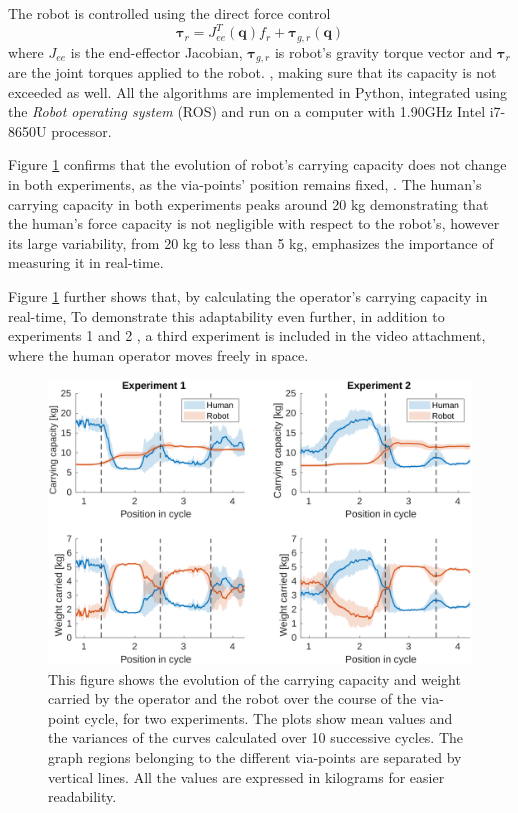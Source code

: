 The robot is controlled using the direct force control
$$
\bm{\tau}_r = J_{ee}^T(\bm{q}) f_r + \bm{\tau}_{g,r}(\bm{q})
$$
where $J_{ee}$ is the end-effector Jacobian, $\bm{\tau}_{g,r}$ is robot's gravity torque vector and $\bm{\tau}_r$ are the joint torques applied to the robot. 
 \cite{skuric:hal-02993408}, making sure that its capacity is not exceeded as well. All the algorithms are implemented in Python, integrated using the \textit{Robot operating system} (ROS) and run on a computer with 1.90GHz Intel i7-8650U processor. 

Figure \ref{fig:experiment_results} confirms that the evolution of robot's carrying capacity does not change in both experiments, as the via-points' position remains fixed, . The human's carrying capacity in both experiments peaks around 20 kg demonstrating that the human's force capacity is not negligible with respect to the robot's, however its large variability, from 20 kg to less than 5 kg, emphasizes the importance of measuring it in real-time.    

Figure \ref{fig:experiment_results} further shows that, by calculating the operator's carrying capacity in real-time, 
To demonstrate this adaptability even further, in addition to  experiments 1 and 2 , a third experiment is included in the video attachment, where the human operator moves freely in space. 

\begin{figure}[!t]
    \centering
    \includegraphics[width=\linewidth]{Papers/images/experiments.pdf}
    \caption{This figure shows the evolution of the carrying capacity and weight carried by the operator and the robot over the course of the via-point cycle, for two experiments. The plots show mean values and the variances of the curves calculated over 10 successive cycles. The graph regions belonging to the different via-points are separated by vertical lines.  All the values are expressed in kilograms for easier readability.}
    \label{fig:experiment_results}
\end{figure}


